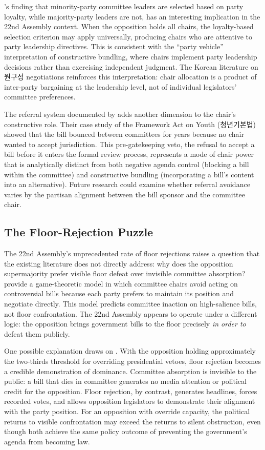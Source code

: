 \documentclass[11pt]{article}
\begin{document}
\citet{kang2023}'s finding that minority-party committee leaders are selected based on party loyalty, while majority-party leaders are not, has an interesting implication in the 22nd Assembly context. When the opposition holds all chairs, the loyalty-based selection criterion may apply universally, producing chairs who are attentive to party leadership directives. This is consistent with the ``party vehicle'' interpretation of constructive bundling, where chairs implement party leadership decisions rather than exercising independent judgment. The Korean literature on 원구성 negotiations \citep{jung2018, leekim2022} reinforces this interpretation: chair allocation is a product of inter-party bargaining at the leadership level, not of individual legislators' committee preferences.

The referral system documented by \citet{parkshin2021} adds another dimension to the chair's constructive role. Their case study of the Framework Act on Youth (청년기본법) showed that the bill bounced between committees for years because no chair wanted to accept jurisdiction. This pre-gatekeeping veto, the refusal to accept a bill before it enters the formal review process, represents a mode of chair power that is analytically distinct from both negative agenda control (blocking a bill within the committee) and constructive bundling (incorporating a bill's content into an alternative). Future research could examine whether referral avoidance varies by the partisan alignment between the bill sponsor and the committee chair.

\subsection{The Floor-Rejection Puzzle}

The 22nd Assembly's unprecedented rate of floor rejections raises a question that the existing literature does not directly address: why does the opposition supermajority prefer visible floor defeat over invisible committee absorption? \citet{seoyoon2020} provide a game-theoretic model in which committee chairs avoid acting on controversial bills because each party prefers to maintain its position and negotiate directly. This model predicts committee inaction on high-salience bills, not floor confrontation. The 22nd Assembly appears to operate under a different logic: the opposition brings government bills to the floor precisely \textit{in order to} defeat them publicly.

One possible explanation draws on \citet{tsebelis2002}. With the opposition holding approximately the two-thirds threshold for overriding presidential vetoes, floor rejection becomes a credible demonstration of dominance. Committee absorption is invisible to the public: a bill that dies in committee generates no media attention or political credit for the opposition. Floor rejection, by contrast, generates headlines, forces recorded votes, and allows opposition legislators to demonstrate their alignment with the party position. For an opposition with override capacity, the political returns to visible confrontation may exceed the returns to silent obstruction, even though both achieve the same policy outcome of preventing the government's agenda from becoming law.
\end{document}

